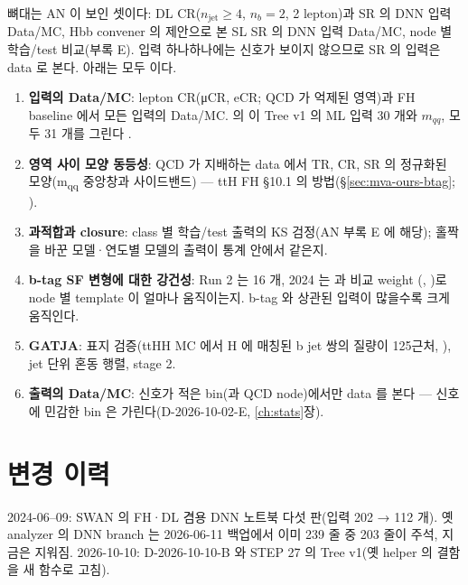 뼈대는 AN 이 보인 셋이다: DL CR($n_{\mathrm{jet}}\ge4$, $n_b=2$, 2 lepton)과 SR 의 DNN 입력 Data/MC,
Hbb convener 의 제안으로 본 SL SR 의 DNN 입력 Data/MC, node 별 학습/test 비교(부록 E). 입력 하나하나에는 신호가
보이지 않으므로 SR 의 입력은 data 로 본다. 아래는 모두 \tagplan 이다.
\begin{enumerate}
\item \textbf{입력의 Data/MC}: lepton CR(μCR, eCR; QCD 가 억제된 영역)과 FH baseline 에서 모든 입력의 Data/MC.  의
   이 Tree v1 의 ML 입력 30 개와 $m_{qq}$, 모두 31 개를 그린다 \tagimpl{}.
\item \textbf{영역 사이 모양 동등성}: QCD 가 지배하는 data 에서 TR, CR, SR 의 정규화된 모양(m\textsubscript{qq} 중앙창과 사이드밴드) — ttH FH §10.1 의
  방법(\S\ref{sec:mva-ours-btag}; ).
\item \textbf{과적합과 closure}: class 별 학습/test 출력의 KS 검정(AN 부록 E 에 해당); 홀짝을 바꾼 모델·연도별 모델의 출력이 통계 안에서 같은지.
\item \textbf{b-tag SF 변형에 대한 강건성}: Run 2 는  16 개, 2024 는  과 비교 weight
  (, )로 node 별 template 이 얼마나 움직이는지. b-tag 와 상관된 입력이 많을수록 크게 움직인다.
\item \textbf{GATJA}: 표지 검증(ttHH MC 에서 H 에 매칭된 b jet 쌍의 질량이 125\GeV 근처, ), jet 단위 혼동 행렬, stage 2.
\item \textbf{출력의 Data/MC}: 신호가 적은 bin(과 QCD node)에서만 data 를 본다 — 신호에 민감한 bin 은 가린다(D-2026-10-02-E, \ref{ch:stats}장).
\end{enumerate}

\section{변경 이력}\label{sec:mva-history}

2024-06--09: SWAN 의 FH·DL 겸용 DNN 노트북 다섯 판(입력 202 → 112 개). 옛 analyzer 의 DNN branch 는 2026-06-11 백업에서
이미 239 줄 중 203 줄이 주석, 지금은 지워짐. 2026-10-10: D-2026-10-10-B 와 STEP 27 의 Tree v1(옛 helper 의 결함을 새 함수로 고침).


